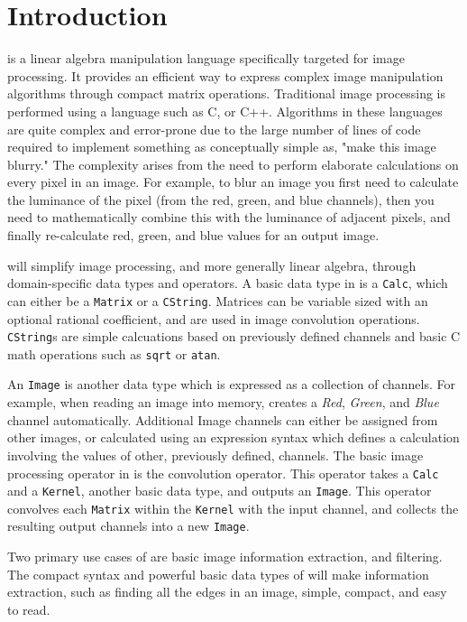 \chapter{Introduction}

\sys{} is a linear algebra manipulation language specifically targeted for
image processing. It provides an efficient way to express complex image
manipulation algorithms through compact matrix operations. Traditional image
processing is performed using a language such as C, or C++. Algorithms in these
languages are quite complex and error-prone due to the large number of lines of
code required to implement something as conceptually simple as, "make this image
blurry." The complexity arises from the need to perform elaborate calculations
on every pixel in an image. For example, to blur an image you first need to
calculate the luminance of the pixel (from the red, green, and blue channels),
then you need to mathematically combine this with the luminance of adjacent pixels,
and finally re-calculate red, green, and blue values for an output image.

\sys{} will simplify image processing, and more generally linear algebra, through
domain-specific data types and operators. A basic data type in \sys{} is a 
\texttt{Calc}, which can either be a \texttt{Matrix} or a \texttt{CString}. 
Matrices can be variable sized with an optional rational coefficient, and are
used in image convolution operations. \texttt{CString}s are simple calcuations
based on previously defined channels and basic C math operations such as \texttt{sqrt}
or \texttt{atan}.

An \texttt{Image} is another \sys{} data type which is expressed as a collection
of channels. For example, when reading an image into memory, \sys{} creates a
\emph{Red}, \emph{Green}, and \emph{Blue} channel automatically. Additional
Image channels can either be assigned from other images, or calculated
using an expression syntax which defines a calculation involving the
values of other, previously defined, channels. The basic image processing operator
in \sys{} is the convolution operator. This operator takes a \texttt{Calc} and a
\texttt{Kernel}, another basic data type, and outputs an \texttt{Image}. This
operator convolves each \texttt{Matrix} within the \texttt{Kernel} with the input channel,
and collects the resulting output channels into a new \texttt{Image}.

Two primary use cases of \sys{} are basic image information extraction, and
filtering. The compact syntax and powerful basic data types of \sys{} will make
information extraction, such as finding all the edges in an image, simple, compact,
and easy to read.

